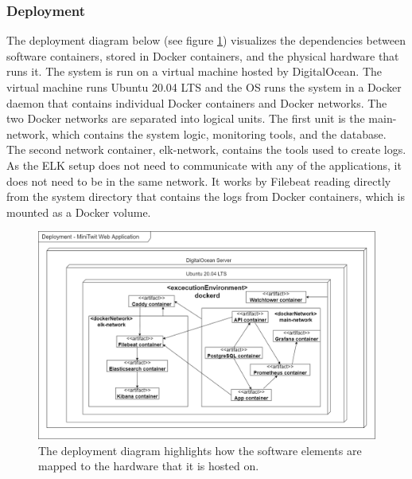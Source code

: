 \subsubsection{Deployment}
The deployment diagram below (see figure \ref{fig:deployment_diagram}) visualizes the dependencies between software containers, stored in Docker containers, and the physical hardware that runs it. The system is run on a virtual machine hosted by DigitalOcean. The virtual machine runs Ubuntu 20.04 LTS and the OS runs the system in a Docker daemon that contains individual Docker containers and Docker networks. 
\newline
The two Docker networks are separated into logical units. The first unit is the main-network, which contains the system logic, monitoring tools, and the database. The second network container, elk-network, contains the tools used to create logs. As the ELK setup does not need to communicate with any of the applications, it does not need to be in the same network. It works by Filebeat reading directly from the system directory that contains the logs from Docker containers, which is mounted as a Docker volume.

\begin{figure}[H]
    \centering
    \includegraphics[scale=0.37]{images/deployment_diagram.png}
    \caption{The deployment diagram highlights how the software elements are mapped to the hardware that it is hosted on.}
    \label{fig:deployment_diagram}
\end{figure}

